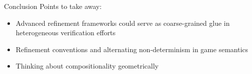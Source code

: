 \documentclass[aspectratio=1610,mathserif]{beamer}
\begin{document}
\begin{frame}{Conclusion}
  Points to take away:
  \begin{itemize}
    \item Advanced refinement frameworks could serve as coarse-grained glue
      in heterogeneous verification efforts
    \item Refinement conventions and alternating non-determinism in game semantics
    \item Thinking about compositionality geometrically
  \end{itemize}
\end{frame}
\end{document}
